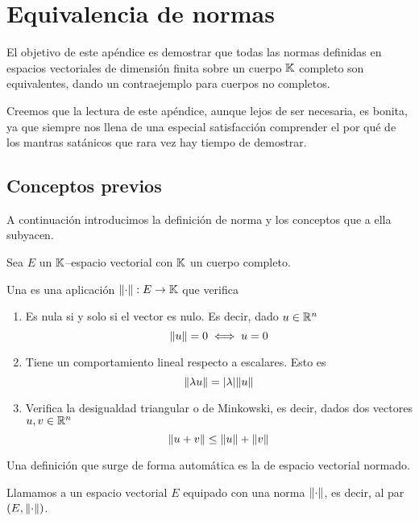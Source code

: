 \chapter{Equivalencia de normas}
\label{norm}
El objetivo de este apéndice es demostrar que todas las normas definidas en espacios vectoriales de dimensión finita sobre un cuerpo $\mathbb{K}$ completo son equivalentes, dando un contraejemplo para cuerpos no completos.

Creemos que la lectura de este apéndice, aunque lejos de ser necesaria, es bonita, ya que siempre nos llena de una especial satisfacción comprender el por qué de los mantras satánicos que rara vez hay tiempo de demostrar.
\section{Conceptos previos}
A continuación introducimos la definición de norma y los conceptos que a ella subyacen.

Sea $E$ un $\mathbb{K}$--espacio vectorial con $\mathbb{K}$ un cuerpo completo.

\begin{defi}[Norma]
	Una  es una aplicación $\lVert\cdot\rVert:E\to\mathbb{K}$ que verifica
	\begin{enumerate}
		\item \label{norma_vector_nulo} Es nula si y solo si el vector es nulo. Es decir, dado $u\in\mathbb{R}^n$
		\begin{equation*}
			\lVert u\rVert=0\iff u=0
		\end{equation*}
		\item \label{norma_lambda} Tiene un comportamiento lineal respecto a escalares. Esto es
		\begin{equation*}
		\lVert\lambda u\rVert=\lvert\lambda\rvert\lVert u\rVert
		\end{equation*}	
		\item \label{norma_triangular} Verifica la desigualdad triangular o de Minkowski, es decir, dados dos vectores $u,v\in\mathbb{R}^n$
		\begin{equation*}
		\lVert u+v\rVert\le \lVert u\rVert+\lVert v\rVert
		\end{equation*}
	\end{enumerate}
\end{defi}
Una definición que surge de forma automática es la de espacio vectorial normado.
\begin{defi}
	Llamamos  a un espacio vectorial $E$ equipado con una norma $\lVert\cdot\rVert$, es decir, al par $(E,\lVert\cdot\rVert)$.
\end{defi}
